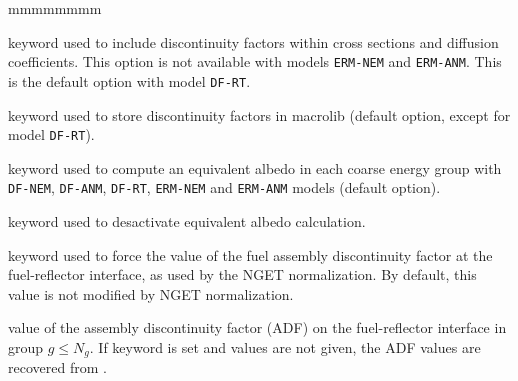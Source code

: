 \begin{ListeDeDescription}{mmmmmmmm}
\item[\moc{SPH}] keyword used to include discontinuity factors within cross sections and diffusion coefficients. This option is not available
with models {\tt ERM-NEM} and {\tt ERM-ANM}. This is the default option with model {\tt DF-RT}.

\item[\moc{NOSP}] keyword used to store discontinuity factors in {\sc macrolib}  (default option, except for model {\tt DF-RT}).

\item[\moc{ALBE}] keyword used to compute an equivalent albedo in each coarse energy group with {\tt DF-NEM}, {\tt DF-ANM}, {\tt DF-RT},
{\tt ERM-NEM} and {\tt ERM-ANM} models (default option).

\item[\moc{NOAL}] keyword used to desactivate equivalent albedo calculation.

\item[\moc{NGET}] keyword used to force the value of the fuel assembly discontinuity factor at the fuel-reflector interface, as used
by the NGET normalization. By default, this value is not modified by NGET normalization.

\item[\dusa{adf}] value of the assembly discontinuity factor (ADF) on the fuel-reflector interface in group $g\le N_g$. If keyword  is set and
 values are not given, the ADF values are recovered from .

\end{ListeDeDescription}

\eject
